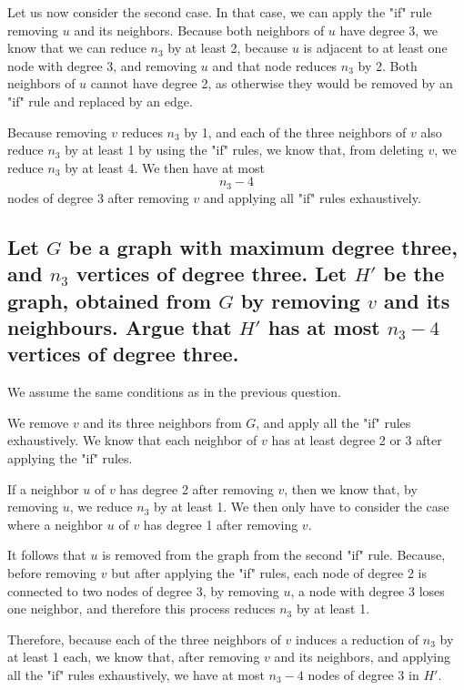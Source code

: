\documentclass{article}
\begin{document}
Let us now consider the second case. In that case, we can apply the "if" rule removing $u$ and its neighbors. Because both neighbors of $u$ have degree 3, we know that we can reduce $n_3$ by at least 2, because $u$ is adjacent to at least one node with degree 3, and removing $u$ and that node reduces $n_3$ by 2. Both neighbors of $u$ cannot have degree 2, as otherwise they would be removed by an "if" rule and replaced by an edge.

Because removing $v$ reduces $n_3$ by 1, and each of the three neighbors of $v$ also reduce $n_3$ by at least 1 by using the "if" rules, we know that, from deleting $v$, we reduce $n_3$ by at least 4. We then have at most
\begin{equation*}
    n_3 - 4
\end{equation*}
nodes of degree 3 after removing $v$ and applying all "if" rules exhaustively.

\subsection{\textbf{Let $G$ be a graph with maximum degree three, and $n_3$ vertices of degree three. Let $H'$ be the graph, obtained from $G$ by removing $v$ and its neighbours. Argue that $H'$ has at most $n_3 - 4$ vertices of degree three.}}

We assume the same conditions as in the previous question.

We remove $v$ and its three neighbors from $G$, and apply all the "if" rules exhaustively.
We know that each neighbor of $v$ has at least degree 2 or 3 after applying the "if" rules.

If a neighbor $u$ of $v$ has degree 2 after removing $v$, then we know that, by removing $u$, we reduce $n_3$ by at least 1. We then only have to consider the case where a neighbor $u$ of $v$ has degree 1 after removing $v$.

It follows that $u$ is removed from the graph from the second "if" rule. Because, before removing $v$ but after applying the "if" rules, each node of degree 2 is connected to two nodes of degree 3, by removing $u$, a node with degree 3 loses one neighbor, and therefore this process reduces $n_3$ by at least 1.

Therefore, because each of the three neighbors of $v$ induces a reduction of $n_3$ by at least 1 each, we know that, after removing $v$ and its neighbors, and applying all the "if" rules exhaustively, we have at most $n_3 - 4$ nodes of degree 3 in $H'$.
\end{document}

